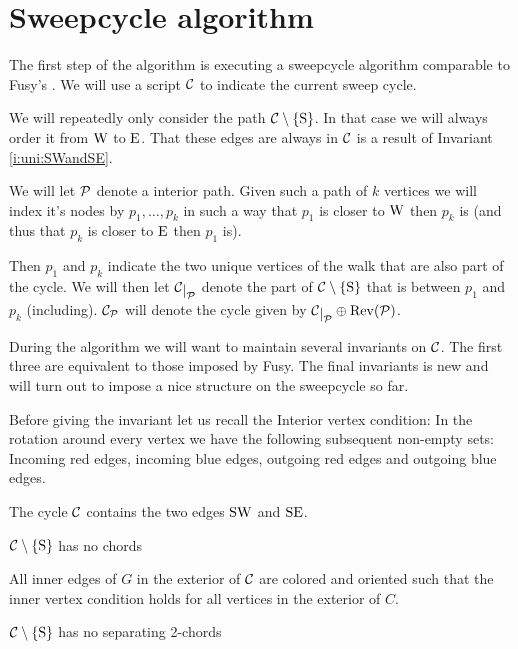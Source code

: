 
\section{Sweepcycle algorithm}
  \label{s:sweep}
  The first step of the algorithm is executing a sweepcycle algorithm comparable to Fusy's \cite{Fusy2006}. We will use a script $\C$ to indicate the current sweep cycle.

  We will repeatedly only consider the path $\cpath$. In that case we will always order it from $\pW$ to $\pE$. That these edges are always in $\C$ is a result of Invariant \ref{i:uni:SWandSE}.

  We will let $\P$ denote a interior path. Given such a path of $k$ vertices we will index it's nodes by $p_1, \ldots, p_k$ in such a way that $p_1$ is closer to $\pW$ then $p_k$ is (and thus that $p_k$ is closer to $\pE$ then $p_1$ is).

  Then $p_1$ and $p_k$ indicate the two unique vertices of the walk that are also part of the cycle. We will then let $\restC{\P}$ denote the part of $\cpath$ that is between $p_1$ and $p_k$ (including). $\C_\P$ will denote the cycle given by $\restC{\P} \oplus \rev(\P)$.

  During the algorithm we will want to maintain several invariants on $\C$. The first three are equivalent to those imposed by Fusy. The final invariants is new and will turn out to impose a nice structure on the sweepcycle so far.

  Before giving the invariant let us recall the Interior vertex condition: In the rotation around every vertex we have the following subsequent non-empty sets: Incoming red edges, incoming blue edges, outgoing red edges and outgoing blue edges.

  \begin{invariants}
    \itemsep=-4pt

    \item \label{i:uni:SWandSE} The cycle $\C$ contains the two edges $\pS \pW$ and $\pS \pE$.
    \item \label{i:uni:noChords} $\cpath$ has no chords
    \item \label{i:uni:intVertCond} All inner edges of $G$ in the exterior of $\C$ are colored and oriented such that the inner vertex condition holds for all vertices in the exterior of $C$.
    \item \label{i:uni:no2Chords} $\C\sm{\pS}$ has no separating 2-chords
  \end{invariants}

